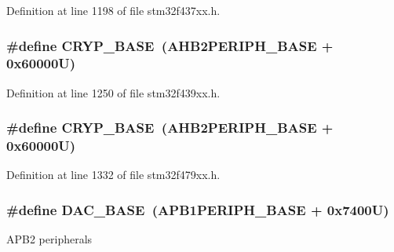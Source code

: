 Definition at line 1198 of file stm32f437xx.\+h.

\subsubsection[{\texorpdfstring{C\+R\+Y\+P\+\_\+\+B\+A\+SE}{CRYP_BASE}}]{\setlength{\rightskip}{0pt plus 5cm}\#define C\+R\+Y\+P\+\_\+\+B\+A\+SE~({\bf A\+H\+B2\+P\+E\+R\+I\+P\+H\+\_\+\+B\+A\+SE} + 0x60000\+U)}\hypertarget{group___peripheral__memory__map_ga019f3ad3b3212e56b45984efd8b8efef}{}\label{group___peripheral__memory__map_ga019f3ad3b3212e56b45984efd8b8efef}


Definition at line 1250 of file stm32f439xx.\+h.

\subsubsection[{\texorpdfstring{C\+R\+Y\+P\+\_\+\+B\+A\+SE}{CRYP_BASE}}]{\setlength{\rightskip}{0pt plus 5cm}\#define C\+R\+Y\+P\+\_\+\+B\+A\+SE~({\bf A\+H\+B2\+P\+E\+R\+I\+P\+H\+\_\+\+B\+A\+SE} + 0x60000\+U)}\hypertarget{group___peripheral__memory__map_ga019f3ad3b3212e56b45984efd8b8efef}{}\label{group___peripheral__memory__map_ga019f3ad3b3212e56b45984efd8b8efef}


Definition at line 1332 of file stm32f479xx.\+h.

\subsubsection[{\texorpdfstring{D\+A\+C\+\_\+\+B\+A\+SE}{DAC_BASE}}]{\setlength{\rightskip}{0pt plus 5cm}\#define D\+A\+C\+\_\+\+B\+A\+SE~({\bf A\+P\+B1\+P\+E\+R\+I\+P\+H\+\_\+\+B\+A\+SE} + 0x7400\+U)}\hypertarget{group___peripheral__memory__map_gad18d0b914c7f68cecbee1a2d23a67d38}{}\label{group___peripheral__memory__map_gad18d0b914c7f68cecbee1a2d23a67d38}
A\+P\+B2 peripherals 

